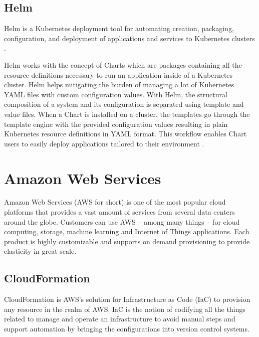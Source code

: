 \subsection{Helm} \label{helm}

Helm is a Kubernetes deployment tool for automating creation, packaging, configuration, and deployment of applications and services to Kubernetes clusters \cite{HelmWhatIs}.

Helm works with the concept of Charts which are packages containing all the resource definitions necessary to run an application inside of a Kubernetes cluster. Helm helps mitigating the burden of managing a lot of Kubernetes YAML files with custom configuration values. With Helm, the structural composition of a system and its configuration is separated using template and value files. When a Chart is installed on a cluster, the templates go through the template engine with the provided configuration values resulting in plain Kubernetes resource definitions in YAML format.  This workflow enables Chart users to easily deploy applications tailored to their environment \cite{Helm}.

\section{Amazon Web Services}

Amazon Web Services (AWS for short) is one of the most popular cloud platforms that provides a vast amount of services from several data centers around the globe. Customers can use AWS -- among many things -- for cloud computing, storage, machine learning and Internet of Things applications. Each product is highly customizable and supports on demand provisioning to provide elasticity in great scale. \cite{AWSWhatIs}
\subsection{CloudFormation} \label{cloudformation}

CloudFormation is AWS's solution for Infrastructure as Code (IaC) to provision any resource in the realm of AWS. IaC is the notion of codifying all the things related to manage and operate an infrastructure to avoid manual steps and support automation by bringing the configurations into version control systems.

